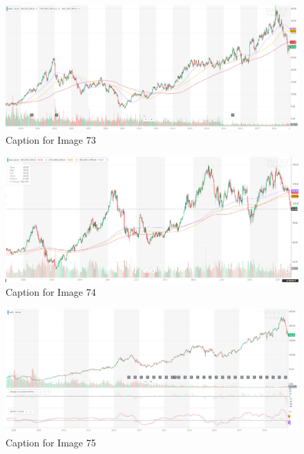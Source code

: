 \documentclass{article}
\begin{document}
\vspace{10pt}

\begin{figure}[!htb]
    \centering
    \includegraphics[width=\textwidth]{imgs/73.png}
    \caption{Caption for Image 73}
\end{figure}

\vspace{10pt}

\begin{figure}[!htb]
    \centering
    \includegraphics[width=\textwidth]{imgs/74.png}
    \caption{Caption for Image 74}
\end{figure}

\vspace{10pt}

\begin{figure}[!htb]
    \centering
    \includegraphics[width=\textwidth]{imgs/75.png}
    \caption{Caption for Image 75}
\end{figure}
\end{document}
